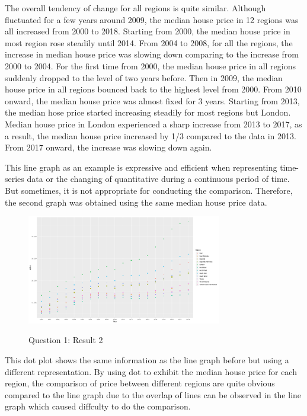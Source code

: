 \documentclass{article}
\begin{document}
The overall tendency of change for all regions is quite similar. Although fluctuated for a few years around 2009, 
the median house price in 12 regions was all increased from 2000 to 2018. Starting from 2000, the median house price in most region rose steadily until 2014. From 2004 to 2008, for all the regions, the increase in
median house price was slowing down comparing to the increase from 2000 to 2004. For the first time from 2000, the median house price in all regions suddenly dropped to the level of two years before. Then in 2009, the median house price in all regions bounced back to the highest level from 2000. From 2010 onward, the median house price was almost fixed for 3 years. Starting from 2013, the median hose price started increasing steadily for most regions but London. Median house price in London experienced a sharp increase from 2013 to 2017, 
as a result, the median house price increased by 1/3 compared to the data in 2013. From 2017 onward, 
the increase was slowing down again.

This line graph as an example is expressive and efficient when representing time-series data or the changing of quantitative during a continuous period of time. But sometimes, it is not appropriate for conducting the comparison. Therefore, the second graph was obtained using the same median house price data.

\begin{figure}[H]
  \begin{minipage}[b]{1.0\linewidth}
    \centering
    \centerline{\includegraphics[width=8.5cm]{Q1Geom_point}}
    \centerline{Question 1: Result 2}\medskip
  \end{minipage}
\end{figure}

This dot plot shows the same information as the line graph before but using a different representation. 
By using dot to exhibit the median house price for each region, the comparison of price between different 
regions are quite obvious compared to the line graph due to the overlap of lines can be observed in the line graph 
which caused diffculty to do the comparison.
\end{document}
